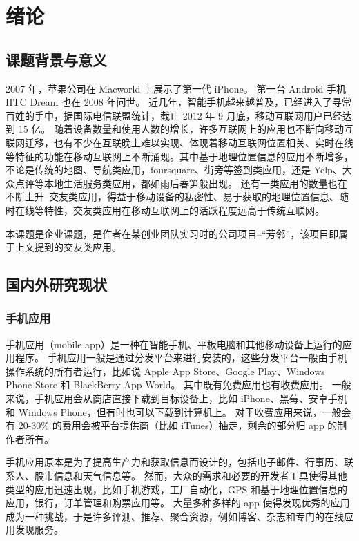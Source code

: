 \chapter{绪论}
\label{introduction}

\section{课题背景与意义}

2007 年，苹果公司在 Macworld 上展示了第一代 iPhone。
第一台 Android 手机 HTC Dream 也在 2008 年问世。
近几年，智能手机越来越普及，已经进入了寻常百姓的手中，据国际电信联盟统计，截止 2012 年 9 月底，移动互联网用户已经达到 15 亿。
随着设备数量和使用人数的增长，许多互联网上的应用也不断向移动互联网迁移，也有不少在互联晚上难以实现、体现着移动互联网位置相关、实时在线等特征的功能在移动互联网上不断涌现。其中基于地理位置信息的应用不断增多，不论是传统的地图、导航类应用，foursquare、街旁等签到类应用，还是 Yelp、大众点评等本地生活服务类应用，都如雨后春笋般出现。
还有一类应用的数量也在不断上升--交友类应用，得益于移动设备的私密性、易于获取的地理位置信息、随时在线等特性，交友类应用在移动互联网上的活跃程度远高于传统互联网。

本课题是企业课题，是作者在某创业团队实习时的公司项目--“芳邻”，该项目即属于上文提到的交友类应用。

\section{国内外研究现状}

\subsection{手机应用}

手机应用（mobile app）是一种在智能手机、平板电脑和其他移动设备上运行的应用程序。
手机应用一般是通过分发平台来进行安装的，这些分发平台一般由手机操作系统的所有者运行，比如说 Apple App Store、Google Play、Windows Phone Store 和 BlackBerry App World。
其中既有免费应用也有收费应用。
一般来说，手机应用会从商店直接下载到目标设备上，比如 iPhone、黑莓、安卓手机和 Windows Phone，但有时也可以下载到计算机上。
对于收费应用来说，一般会有 20-30\% 的费用会被平台提供商（比如 iTunes）抽走，剩余的部分归 app 的制作者所有。

手机应用原本是为了提高生产力和获取信息而设计的，包括电子邮件、行事历、联系人、股市信息和天气信息等。
然而，大众的需求和必要的开发者工具使得其他类型的应用迅速出现，比如手机游戏，工厂自动化，GPS 和基于地理位置信息的应用，银行，订单管理和购票应用等。
大量多种多样的 app 使得发现优秀的应用成为一种挑战，于是许多评测、推荐、聚合资源，例如博客、杂志和专门的在线应用发现服务。

